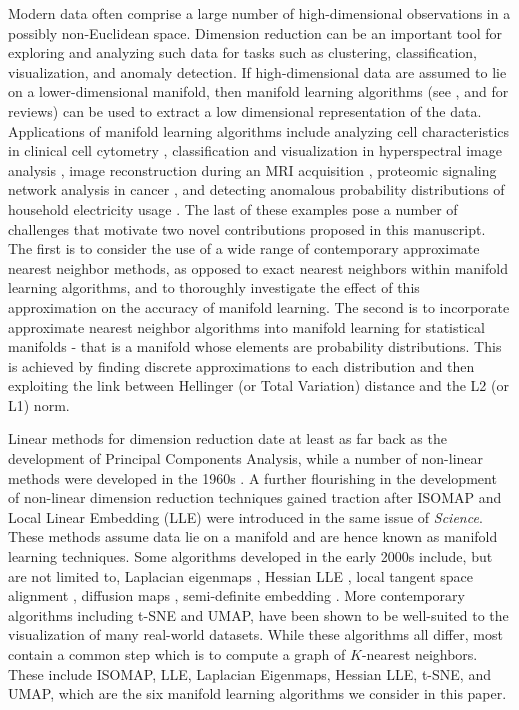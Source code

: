 \documentclass[11pt,a4paper,]{article}
\begin{document}
Modern data often comprise a large number of high-dimensional observations in a possibly non-Euclidean space. Dimension reduction can be an important tool for exploring and analyzing such data for tasks such as clustering, classification, visualization, and anomaly detection. If high-dimensional data are assumed to lie on a lower-dimensional manifold, then
manifold learning algorithms (see \textcite{Cayton2005-dp}, \textcite{Lee2007-wq} and \textcite{Izenman2012-mx} for reviews) can be used to extract a low dimensional representation of the data. Applications of manifold learning algorithms include analyzing cell characteristics in clinical cell cytometry \autocite{Carter2009-ti}, classification and visualization in hyperspectral image analysis \autocite{Lunga2014-kc}, image reconstruction during an MRI acquisition \autocite{Zhu2018-jw}, proteomic signaling network analysis in cancer \autocite{Banerjee2019-at}, and detecting anomalous probability distributions of household electricity usage \autocite{Hyndman2018-ia}. The last of these examples pose a number of challenges that motivate two novel contributions proposed in this manuscript. The first is to consider the use of a wide range of contemporary approximate nearest neighbor methods, as opposed to exact nearest neighbors within manifold learning algorithms, and to thoroughly investigate the effect of this approximation on the accuracy of manifold learning. The second is to incorporate approximate nearest neighbor algorithms into manifold learning for statistical manifolds - that is a manifold whose elements are probability distributions. This is achieved by finding discrete approximations to each distribution and then exploiting the link between Hellinger (or Total Variation) distance and the L2 (or L1) norm.

Linear methods for dimension reduction date at least as far back as the development of Principal Components Analysis, while a number of non-linear methods were developed in the 1960s \autocite{Shepard1962-ac,Shepard1962-ft,Kruskal1964-iv,Kruskal1964-md}. A further flourishing in the development of non-linear dimension reduction techniques gained traction after ISOMAP \autocite{Tenenbaum2000-fr} and Local Linear Embedding (LLE) \autocite{Roweis2000-ni} were introduced in the same issue of \emph{Science}. These methods assume data lie on a manifold and are hence known as manifold learning techniques. Some algorithms developed in the early 2000s include, but are not limited to, Laplacian eigenmaps \autocite{Belkin2003-kz}, Hessian LLE \autocite{Donoho2003-am}, local tangent space alignment \autocite{Zhang2003-yi}, diffusion maps \autocite{Nadler2006-cm,Coifman2006-no}, semi-definite embedding \autocite{Weinberger2006-dc}. More contemporary algorithms including t-SNE \autocite{Van_der_Maaten2008-dv} and UMAP\autocite{McInnes2018-xo}, have been shown to be well-suited to the visualization of many real-world datasets. While these algorithms all differ, most contain a common step which is to compute a graph of \(K\)-nearest neighbors. These include ISOMAP, LLE, Laplacian Eigenmaps, Hessian LLE, t-SNE, and UMAP, which are the six manifold learning algorithms we consider in this paper.
\end{document}
